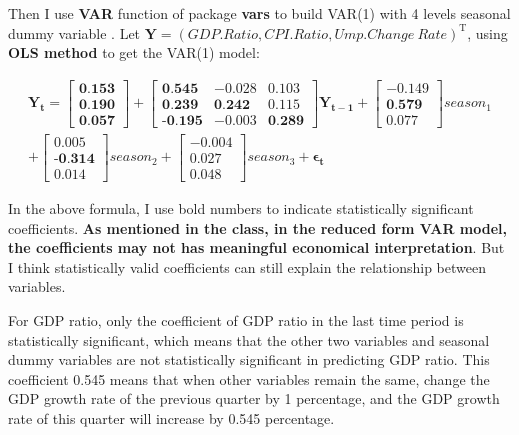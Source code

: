 \documentclass{report}
\begin{document}
Then I use \textbf{VAR} function of package \textbf{vars} to build VAR(1) with 4 levels seasonal dummy variable .  Let  $\bm{Y}=(GDP.Ratio,CPI.Ratio,Ump.Change\ Rate)^{\mathrm{T}}$, using \textbf{OLS method} to get the VAR(1) model:

\begin{equation*}%
\begin{split}
\bm{Y_t} = 
\left[ \begin{matrix}
\textbf{0.153} \\
\textbf{0.190} \\
\textbf{0.057}
\end{matrix}\right] +
\left[ \begin{matrix}
\textbf{0.545}&-0.028&0.103\\
\textbf{0.239}&\textbf{0.242}&0.115\\
\textbf{-0.195}&-0.003&\textbf{0.289}
\end{matrix}\right] \bm{Y_{t-1}} +
\left[ \begin{matrix}
-0.149\\
\textbf{0.579}\\
0.077
\end{matrix}\right]season_1 \\ +
\left[ \begin{matrix}
0.005\\
\textbf{-0.314}\\
0.014
\end{matrix}\right]season_2 + 
\left[ \begin{matrix}
-0.004\\
0.027\\
0.048
\end{matrix}\right]season_3 + \bm{\epsilon_t}
\end{split}
\end{equation*}


In the above formula, I use bold numbers to indicate statistically significant coefficients. \textbf{As mentioned in the class, in the reduced form VAR model, the coefficients may not has meaningful
economical interpretation}. But I think statistically valid coefficients can still explain the relationship between variables.

For GDP ratio, only the coefficient of GDP ratio in the last time period is statistically significant, which means that the other two variables and seasonal dummy variables are not statistically significant in predicting GDP ratio. This coefficient 0.545 means that when other variables remain the same, change the GDP growth rate of the previous quarter by 1 percentage, and the GDP growth rate of this quarter will increase by 0.545 percentage.
\end{document}
